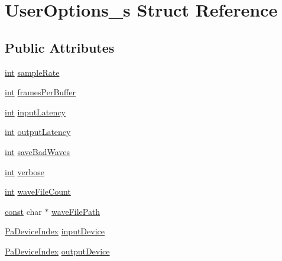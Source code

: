 \hypertarget{struct_user_options__s}{}\section{User\+Options\+\_\+s Struct Reference}
\label{struct_user_options__s}
\subsection*{Public Attributes}
\begin{DoxyCompactItemize}
\item 
\hyperlink{xmltok_8h_a5a0d4a5641ce434f1d23533f2b2e6653}{int} \hyperlink{struct_user_options__s_ae4f2d1b04d8abfd7f914071dd83d72cb}{sample\+Rate}
\item 
\hyperlink{xmltok_8h_a5a0d4a5641ce434f1d23533f2b2e6653}{int} \hyperlink{struct_user_options__s_a4c32d5a6b71075b1ba9d453dc4b22adb}{frames\+Per\+Buffer}
\item 
\hyperlink{xmltok_8h_a5a0d4a5641ce434f1d23533f2b2e6653}{int} \hyperlink{struct_user_options__s_ad8d5ceaf8b4494362586252762b9eb37}{input\+Latency}
\item 
\hyperlink{xmltok_8h_a5a0d4a5641ce434f1d23533f2b2e6653}{int} \hyperlink{struct_user_options__s_a207c931153d1952efbfb78c535f5df12}{output\+Latency}
\item 
\hyperlink{xmltok_8h_a5a0d4a5641ce434f1d23533f2b2e6653}{int} \hyperlink{struct_user_options__s_ac751b01bd9ded7a65a50d41219b23a1f}{save\+Bad\+Waves}
\item 
\hyperlink{xmltok_8h_a5a0d4a5641ce434f1d23533f2b2e6653}{int} \hyperlink{struct_user_options__s_a1138b348f87d0906ec8ca000fd58e537}{verbose}
\item 
\hyperlink{xmltok_8h_a5a0d4a5641ce434f1d23533f2b2e6653}{int} \hyperlink{struct_user_options__s_a3c1d3a70ed9aad03cb1b975487dec961}{wave\+File\+Count}
\item 
\hyperlink{getopt1_8c_a2c212835823e3c54a8ab6d95c652660e}{const} char $\ast$ \hyperlink{struct_user_options__s_a7dd5cdc14cbf0ad8403c08576d4a2b83}{wave\+File\+Path}
\item 
\hyperlink{portaudio_8h_ad79317e65bde63d76c4b8e711ac5a361}{Pa\+Device\+Index} \hyperlink{struct_user_options__s_afa87fa54d0095b6182df9b77704d4301}{input\+Device}
\item 
\hyperlink{portaudio_8h_ad79317e65bde63d76c4b8e711ac5a361}{Pa\+Device\+Index} \hyperlink{struct_user_options__s_a298b4381f4ebea29104af322c95cfe3e}{output\+Device}
\end{DoxyCompactItemize}


